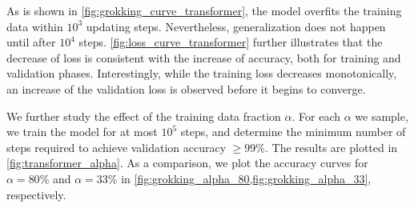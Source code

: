 As is shown in \cref{fig:grokking_curve_transformer}, the model overfits the training data within $10^3$ updating steps.
Nevertheless, generalization does not happen until after $10^4$ steps.
\cref{fig:loss_curve_transformer} further illustrates that the decrease of loss is consistent with the increase of accuracy, both for training and validation phases.
Interestingly, while the training loss decreases monotonically, an increase of the validation loss is observed before it begins to converge.

We further study the effect of the training data fraction $\alpha$. 
For each $\alpha$ we sample, we train the model for at most $10^5$ steps, and determine the minimum number of steps required to achieve validation accuracy $\geq 99\%$.
The results are plotted in \cref{fig:transformer_alpha}.
As a comparison, we plot the accuracy curves for $\alpha = 80\%$ and $\alpha = 33\%$ in \cref{fig:grokking_alpha_80,fig:grokking_alpha_33}, respectively.

